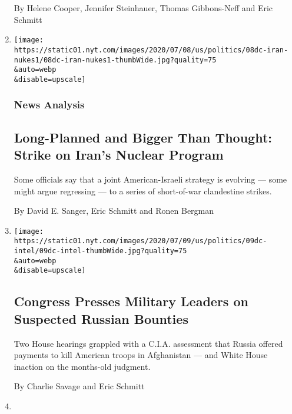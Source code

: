 \begin{enumerate}
  By Helene Cooper, Jennifer Steinhauer, Thomas Gibbons-Neff and Eric
  Schmitt
\item
  \href{/2020/07/10/world/middleeast/iran-nuclear-trump.html}{}

  \texttt{[image: https://static01.nyt.com/images/2020/07/08/us/politics/08dc-iran-nukes1/08dc-iran-nukes1-thumbWide.jpg?quality=75\\\&auto=webp\\\&disable=upscale]}

  \hypertarget{news-analysis}{%
  \subsubsection{News Analysis}\label{news-analysis}}

  \hypertarget{long-planned-and-bigger-than-thought-strike-on-irans-nuclear-program}{%
  \subsection{Long-Planned and Bigger Than Thought: Strike on Iran's
  Nuclear
  Program}\label{long-planned-and-bigger-than-thought-strike-on-irans-nuclear-program}}

  Some officials say that a joint American-Israeli strategy is evolving
  --- some might argue regressing --- to a series of short-of-war
  clandestine strikes.

  By David E. Sanger, Eric Schmitt and Ronen Bergman
\item
  \href{/2020/07/09/us/politics/congress-russian-bounties.html}{}

  \texttt{[image: https://static01.nyt.com/images/2020/07/09/us/politics/09dc-intel/09dc-intel-thumbWide.jpg?quality=75\\\&auto=webp\\\&disable=upscale]}

  \hypertarget{congress-presses-military-leaders-on-suspected-russian-bounties}{%
  \subsection{Congress Presses Military Leaders on Suspected Russian
  Bounties}\label{congress-presses-military-leaders-on-suspected-russian-bounties}}

  Two House hearings grappled with a C.I.A. assessment that Russia
  offered payments to kill American troops in Afghanistan --- and White
  House inaction on the months-old judgment.

  By Charlie Savage and Eric Schmitt
\item
  \href{/2020/07/08/us/politics/vindman-trump-ukraine-impeachment.html}{}


\end{enumerate}
